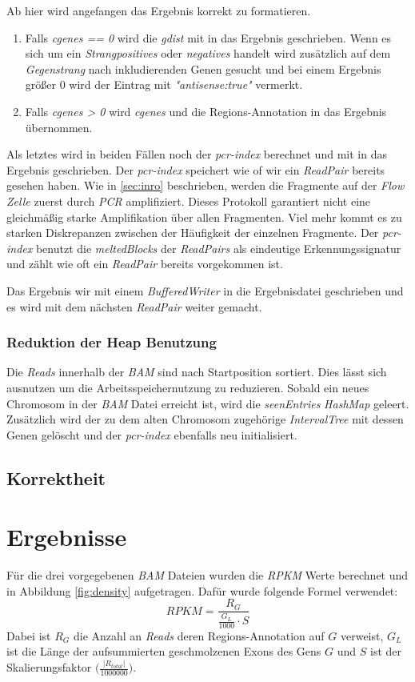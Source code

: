 \documentclass[12pt]{article}
\begin{document}
Ab hier wird angefangen das Ergebnis korrekt zu formatieren.
\begin{enumerate}
    \item Falls \textit{cgenes == 0} wird die \textit{gdist} mit in das Ergebnis geschrieben.
      Wenn es sich um ein \textit{Strangpositives} oder \textit{negatives} handelt wird 
      zusätzlich auf dem \textit{Gegenstrang} nach inkludierenden Genen gesucht und bei
      einem Ergebnis grö\ss er 0 wird der Eintrag mit \textit{"antisense:true"} vermerkt.
    \item Falls \textit{cgenes > 0} wird \textit{cgenes} und die Regions-Annotation in das
        Ergebnis übernommen.
\end{enumerate}
Als letztes wird in beiden Fällen noch der \textit{pcr-index} berechnet und mit in das Ergebnis geschrieben.
Der \textit{pcr-index} speichert wie of wir ein \textit{ReadPair} bereits gesehen haben.
Wie in \ref{sec:inro} beschrieben, werden die Fragmente auf der \textit{Flow Zelle} zuerst durch \textit{PCR}
amplifiziert. Dieses Protokoll garantiert nicht eine gleichmä\ss ig starke Amplifikation über allen
Fragmenten. Viel mehr kommt es zu starken Diskrepanzen zwischen der Häufigkeit der einzelnen Fragmente. 
Der \textit{pcr-index} benutzt die \textit{meltedBlocks} der \textit{ReadPairs} als eindeutige Erkennungssignatur 
und zählt wie oft ein \textit{ReadPair} bereits vorgekommen ist.

Das Ergebnis wir mit einem \textit{BufferedWriter} in die Ergebnisdatei geschrieben und es wird mit dem nächsten 
\textit{ReadPair} weiter gemacht.

\subsubsection{Reduktion der Heap Benutzung}
Die \textit{Reads} innerhalb der \textit{BAM} sind nach Startposition sortiert. 
Dies lässt sich ausnutzen um die Arbeitsspeichernutzung zu reduzieren. Sobald
ein neues Chromosom in der \textit{BAM} Datei erreicht ist, wird die \textit{seenEntries} \textit{HashMap}
geleert. Zusätzlich wird der zu dem alten Chromosom zugehörige \textit{IntervalTree} mit dessen 
Genen gelöscht und der \textit{pcr-index} ebenfalls neu initialisiert.
\subsection{Korrektheit}

\section{Ergebnisse}
Für die drei vorgegebenen \textit{BAM} Dateien  wurden die \textit{RPKM} Werte berechnet
und in Abbildung \ref{fig:density} aufgetragen. Dafür wurde folgende Formel verwendet:
\[
    RPKM = \frac{R_{G}}{\frac{G_{L}}{1000} \cdot S}
\]
Dabei ist $R_{G}$ die Anzahl an \textit{Reads} deren Regions-Annotation auf $G$ verweist,
$G_{L}$ ist die Länge der aufsummierten geschmolzenen Exons des Gens $G$ und $S$ ist der
Skalierungsfaktor $\Big(\frac{|R_{total}|}{1000000}\Big)$.
\end{document}

